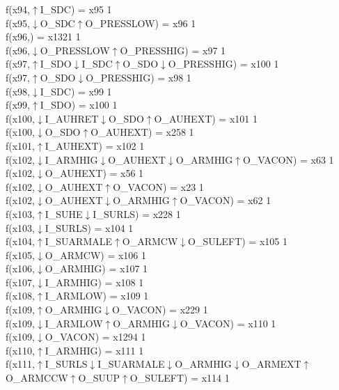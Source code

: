 f(x94,$\uparrow$I\_SDC) = x95 {1} \\
f(x95,$\downarrow$O\_SDC$\uparrow$O\_PRESSLOW) = x96 {1} \\
f(x96,) = x1321 {1} \\
f(x96,$\downarrow$O\_PRESSLOW$\uparrow$O\_PRESSHIG) = x97 {1} \\
f(x97,$\uparrow$I\_SDO$\downarrow$I\_SDC$\uparrow$O\_SDO$\downarrow$O\_PRESSHIG) = x100 {1} \\
f(x97,$\uparrow$O\_SDO$\downarrow$O\_PRESSHIG) = x98 {1} \\
f(x98,$\downarrow$I\_SDC) = x99 {1} \\
f(x99,$\uparrow$I\_SDO) = x100 {1} \\
f(x100,$\downarrow$I\_AUHRET$\downarrow$O\_SDO$\uparrow$O\_AUHEXT) = x101 {1} \\
f(x100,$\downarrow$O\_SDO$\uparrow$O\_AUHEXT) = x258 {1} \\
f(x101,$\uparrow$I\_AUHEXT) = x102 {1} \\
f(x102,$\downarrow$I\_ARMHIG$\downarrow$O\_AUHEXT$\downarrow$O\_ARMHIG$\uparrow$O\_VACON) = x63 {1} \\
f(x102,$\downarrow$O\_AUHEXT) = x56 {1} \\
f(x102,$\downarrow$O\_AUHEXT$\uparrow$O\_VACON) = x23 {1} \\
f(x102,$\downarrow$O\_AUHEXT$\downarrow$O\_ARMHIG$\uparrow$O\_VACON) = x62 {1} \\
f(x103,$\uparrow$I\_SUHE$\downarrow$I\_SURLS) = x228 {1} \\
f(x103,$\downarrow$I\_SURLS) = x104 {1} \\
f(x104,$\uparrow$I\_SUARMALE$\uparrow$O\_ARMCW$\downarrow$O\_SULEFT) = x105 {1} \\
f(x105,$\downarrow$O\_ARMCW) = x106 {1} \\
f(x106,$\downarrow$O\_ARMHIG) = x107 {1} \\
f(x107,$\downarrow$I\_ARMHIG) = x108 {1} \\
f(x108,$\uparrow$I\_ARMLOW) = x109 {1} \\
f(x109,$\uparrow$O\_ARMHIG$\downarrow$O\_VACON) = x229 {1} \\
f(x109,$\downarrow$I\_ARMLOW$\uparrow$O\_ARMHIG$\downarrow$O\_VACON) = x110 {1} \\
f(x109,$\downarrow$O\_VACON) = x1294 {1} \\
f(x110,$\uparrow$I\_ARMHIG) = x111 {1} \\
f(x111,$\uparrow$I\_SURLS$\downarrow$I\_SUARMALE$\downarrow$O\_ARMHIG$\downarrow$O\_ARMEXT$\uparrow$O\_ARMCCW$\uparrow$O\_SUUP$\uparrow$O\_SULEFT) = x114 {1} \\
